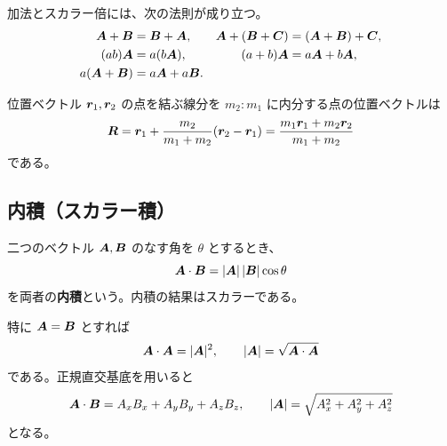 加法とスカラー倍には、次の法則が成り立つ。
\begin{align}
  \bm{A}+\bm{B}&=\bm{B}+\bm{A}, &
  \bm{A}+(\bm{B}+\bm{C})&=(\bm{A}+\bm{B})+\bm{C},\\
  (ab)\bm{A}&=a(b\bm{A}), &
  (a+b)\bm{A}&=a\bm{A}+b\bm{A},\\
  a(\bm{A}+\bm{B})&=a\bm{A}+a\bm{B}.&&
\end{align}

\begin{example}[内分点の位置ベクトル]
位置ベクトル $\bm{r}_1,\bm{r}_2$ の点を結ぶ線分を
$m_2:m_1$ に内分する点の位置ベクトルは
\begin{equation}
  \bm{R}=\bm{r}_1+\frac{m_2}{m_1+m_2}(\bm{r}_2-\bm{r}_1)
  =\frac{m_1\bm{r}_1+m_2\bm{r}_2}{m_1+m_2}
\end{equation}
である。
\begin{center}
\end{center}
\end{example}

\subsection{内積（スカラー積）}

\begin{definition}
二つのベクトル $\bm{A},\bm{B}$ のなす角を $\theta$ とするとき、
\begin{equation}
  \bm{A}\cdot\bm{B}=|\bm{A}|\,|\bm{B}|\cos\theta
\end{equation}
を両者の\textbf{内積}という。内積の結果はスカラーである。
\end{definition}

特に $\bm{A}=\bm{B}$ とすれば
\begin{equation}
  \bm{A}\cdot\bm{A}=|\bm{A}|^2,\qquad
  |\bm{A}|=\sqrt{\bm{A}\cdot\bm{A}}
\end{equation}
である。正規直交基底を用いると
\begin{equation}
  \bm{A}\cdot\bm{B}=A_xB_x+A_yB_y+A_zB_z,\qquad
  |\bm{A}|=\sqrt{A_x^2+A_y^2+A_z^2}
\end{equation}
となる。

